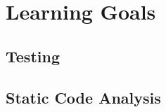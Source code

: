 \section{Learning Goals} %
\label{sec:Learning Goals}

\subsection{Testing} %
\label{sub:Testing}

\subsection{Static Code Analysis} %
\label{sub:Static Code Analysis}

